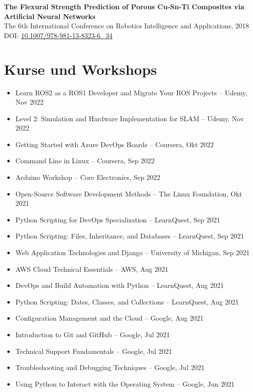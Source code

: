 \documentclass[11pt,a4paper]{article}
\begin{document}
\textbf{The Flexural Strength Prediction of Porous Cu-Sn-Ti Composites via Artificial Neural Networks}\\
The 6th International Conference on Robotics Intelligence and Applications, 2018\\
DOI: \href{https://doi.org/10.1007/978-981-13-8323-6_34}{10.1007/978-981-13-8323-6\_34}

\section*{Kurse und Workshops}

\begin{itemize}
    \item Learn ROS2 as a ROS1 Developer and Migrate Your ROS Projects -- Udemy, Nov 2022
    \item Level 2: Simulation and Hardware Implementation for SLAM -- Udemy, Nov 2022
    \item Getting Started with Azure DevOps Boards -- Coursera, Okt 2022
    \item Command Line in Linux -- Coursera, Sep 2022
    \item Arduino Workshop -- Core Electronics, Sep 2022
    \item Open-Source Software Development Methods -- The Linux Foundation, Okt 2021
    \item Python Scripting for DevOps Specialization -- LearnQuest, Sep 2021
    \item Python Scripting: Files, Inheritance, and Databases -- LearnQuest, Sep 2021
    \item Web Application Technologies and Django -- University of Michigan, Sep 2021
    \item AWS Cloud Technical Essentials -- AWS, Aug 2021
    \item DevOps and Build Automation with Python -- LearnQuest, Aug 2021
    \item Python Scripting: Dates, Classes, and Collections -- LearnQuest, Aug 2021
    \item Configuration Management and the Cloud -- Google, Aug 2021
    \item Introduction to Git and GitHub -- Google, Jul 2021
    \item Technical Support Fundamentals -- Google, Jul 2021
    \item Troubleshooting and Debugging Techniques -- Google, Jul 2021
    \item Using Python to Interact with the Operating System -- Google, Jun 2021

\end{itemize}
\end{document}
